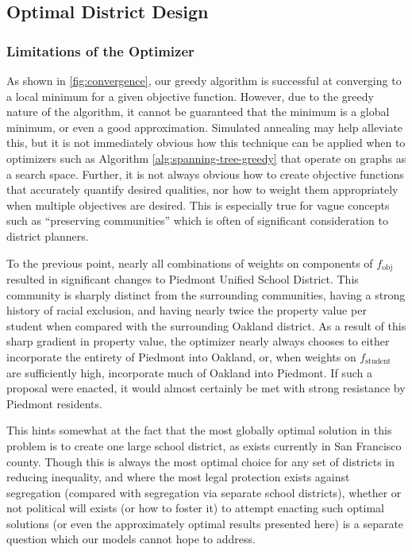\documentclass{article}
\begin{document}
\subsection{Optimal District Design}\label{sec:optimizer-discussion}
\subsubsection{Limitations of the Optimizer}
As shown in \ref{fig:convergence}, our greedy algorithm is successful at converging to a local minimum for a given objective function. However, due to the greedy nature of the algorithm, it cannot be guaranteed that the minimum is a global minimum, or even a good approximation. Simulated annealing may help alleviate this, but it is not immediately obvious how this technique can be applied when to optimizers such as Algorithm \ref{alg:spanning-tree-greedy} that operate on graphs as a search space. Further, it is not always obvious how to create objective functions that accurately quantify desired qualities, nor how to weight them appropriately when multiple objectives are desired. This is especially true for vague concepts such as ``preserving communities'' which is often of significant consideration to district planners.

To the previous point, nearly all combinations of weights on components of \(f_{\text{obj}}\) resulted in significant changes to Piedmont Unified School District. This community is sharply distinct from the surrounding communities, having a strong history of racial exclusion\autocite{jphillips}, and having nearly twice the property value per student when compared with the surrounding Oakland district. As a result of this sharp gradient in property value, the optimizer nearly always chooses to either incorporate the entirety of Piedmont into Oakland, or, when weights on \(f_{\text{student}}\) are sufficiently high, incorporate much of Oakland into Piedmont. If such a proposal were enacted, it would almost certainly be met with strong resistance by Piedmont residents.

This hints somewhat at the fact that the most globally optimal solution in this problem is to create one large school district, as exists currently in San Francisco county. Though this is always the most optimal choice for any set of districts in reducing inequality, and where the most legal protection exists against segregation (compared with segregation via separate school districts), whether or not political will exists (or how to foster it) to attempt enacting such optimal solutions (or even the approximately optimal results presented here) is a separate question which our models cannot hope to address.
\end{document}
